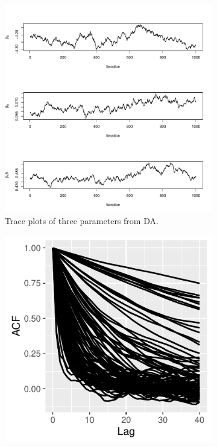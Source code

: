 \documentclass[10pt]{article}
\begin{document}
 \begin{figure}[H]
   \begin{subfigure}[b]{0.45\textwidth}
 \includegraphics[width=1\textwidth]{traceplot_poisson_da.pdf}
 \caption{Trace plots of three parameters from DA.}
  \label{traceplot_poi_da}
 \end{subfigure}
  \hfill 
 \begin{subfigure}[b]{0.45\textwidth}
 \includegraphics[width=1\textwidth]{poisson_da_acf.pdf}

\end{subfigure}
\end{figure}
\end{document}
